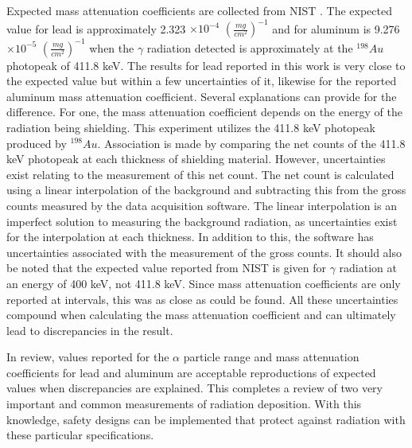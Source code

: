 Expected mass attenuation coefficients are collected from NIST \cite{nist}. The expected value for lead is approximately 2.323 $\times 10^{-4}$ $(\frac{mg}{cm^2})^{-1}$ and for aluminum is 9.276 $\times 10^{-5}$ $(\frac{mg}{cm^2})^{-1}$ when the $\gamma$ radiation detected is approximately at the ${}^{198}Au$ photopeak of 411.8 keV. The results for lead reported in this work is very close to the expected value but within a few uncertainties of it, likewise for the reported aluminum mass attenuation coefficient. Several explanations can provide for the difference. For one, the mass attenuation coefficient depends on the energy of the radiation being shielding. This experiment utilizes the 411.8 keV photopeak produced by ${}^{198}Au$. Association is made by comparing the net counts of the 411.8 keV photopeak at each thickness of shielding material. However, uncertainties exist relating to the measurement of this net count. The net count is calculated using a linear interpolation of the background and subtracting this from the gross counts measured by the data acquisition software. The linear interpolation is an imperfect solution to measuring the background radiation, as uncertainties exist for the interpolation at each thickness. In addition to this, the software has uncertainties associated with the measurement of the gross counts. It should also be noted that the expected value reported from NIST is given for $\gamma$ radiation at an energy of 400 keV, not 411.8 keV. Since mass attenuation coefficients are only reported at intervals, this was as close as could be found. All these uncertainties compound when calculating the mass attenuation coefficient and can ultimately lead to discrepancies in the result.

In review, values reported for the $\alpha$ particle range and mass attenuation coefficients for lead and aluminum are acceptable reproductions of expected values when discrepancies are explained. This completes a review of two very important and common measurements of radiation deposition. With this knowledge, safety designs can be implemented that protect against radiation with these particular specifications.
